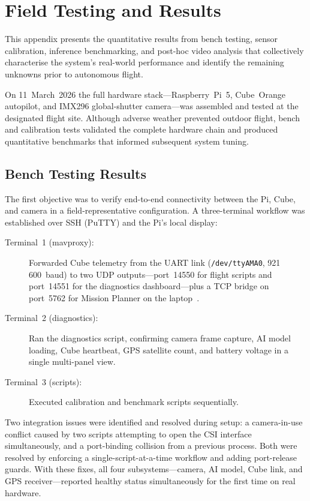 \section{Field Testing and Results}\label{sec:results}

This appendix presents the quantitative results from bench testing, sensor calibration, inference benchmarking, and post-hoc video analysis that collectively characterise the system's real-world performance and identify the remaining unknowns prior to autonomous flight.

On 11~March~2026 the full hardware stack---Raspberry~Pi~5, Cube~Orange autopilot, and IMX296 global-shutter camera---was assembled and tested at the designated flight site. Although adverse weather prevented outdoor flight, bench and calibration tests validated the complete hardware chain and produced quantitative benchmarks that informed subsequent system tuning.

\subsection{Bench Testing Results}\label{sec:bench-results}

The first objective was to verify end-to-end connectivity between the Pi, Cube, and camera in a field-representative configuration. A three-terminal workflow was established over SSH (PuTTY) and the Pi's local display:

\begin{description}
    \item[Terminal~1 (mavproxy):] Forwarded Cube telemetry from the UART link (\texttt{/dev/ttyAMA0}, 921\,600~baud) to two UDP outputs---port~14550 for flight scripts and port~14551 for the diagnostics dashboard---plus a TCP bridge on port~5762 for Mission Planner on the laptop~\cite{mavproxy}.
    \item[Terminal~2 (diagnostics):] Ran the diagnostics script, confirming camera frame capture, AI model loading, Cube heartbeat, GPS satellite count, and battery voltage in a single multi-panel view.
    \item[Terminal~3 (scripts):] Executed calibration and benchmark scripts sequentially.
\end{description}

Two integration issues were identified and resolved during setup: a camera-in-use conflict caused by two scripts attempting to open the CSI interface simultaneously, and a port-binding collision from a previous process. Both were resolved by enforcing a single-script-at-a-time workflow and adding port-release guards. With these fixes, all four subsystems---camera, AI model, Cube link, and GPS receiver---reported healthy status simultaneously for the first time on real hardware.

